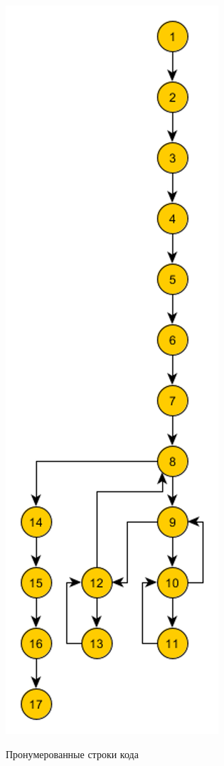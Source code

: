\documentclass[12pt]{report}
\begin{document}
\begin{figure}[H]	
	\centering	
	{\includegraphics[scale=0.8]{gu.png}}
	\caption{Пронумерованные строки кода}
\end{figure}
\end{document}
